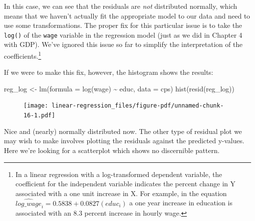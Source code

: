 \documentclass[
  letterpaper,
]{book}
\newenvironment{Shaded}{\begin{snugshade}}{\end{snugshade}}
\newcommand{\AttributeTok}[1]{\textcolor[rgb]{0.40,0.45,0.13}{#1}}
\newcommand{\FunctionTok}[1]{\textcolor[rgb]{0.28,0.35,0.67}{#1}}
\newcommand{\NormalTok}[1]{\textcolor[rgb]{0.00,0.23,0.31}{#1}}
\newcommand{\OtherTok}[1]{\textcolor[rgb]{0.00,0.23,0.31}{#1}}
\newcommand{\SpecialCharTok}[1]{\textcolor[rgb]{0.37,0.37,0.37}{#1}}
\begin{document}
In this case, we can see that the residuals are \emph{not} distributed
normally, which means that we haven't actually fit the appropriate model
to our data and need to use some transformations. The proper fix for
this particular issue is to take the \texttt{log()} of the \texttt{wage}
variable in the regression model (just as we did in Chapter 4 with GDP).
We've ignored this issue so far to simplify the interpretation of the
coefficients.\footnote{In a linear regression with a log-transformed
  dependent variable, the coefficient for the independent variable
  indicates the percent change in Y associated with a one unit increase
  in X. For example, in the equation
  \(\widehat{log\_wage}_{i} = 0.5838 + 0.0827(educ_i)\) a one year
  increase in education is associated with an 8.3 percent increase in
  hourly wage.}

If we were to make this fix, however, the histogram shows the results:

\begin{Shaded}
\begin{Highlighting}[]
\NormalTok{reg\_log }\OtherTok{\textless{}{-}} \FunctionTok{lm}\NormalTok{(}\AttributeTok{formula =} \FunctionTok{log}\NormalTok{(wage) }\SpecialCharTok{\textasciitilde{}}\NormalTok{ educ, }\AttributeTok{data =}\NormalTok{ cps)}
\FunctionTok{hist}\NormalTok{(}\FunctionTok{resid}\NormalTok{(reg\_log))}
\end{Highlighting}
\end{Shaded}

\begin{figure}[H]

{\centering \texttt{[image: linear-regression\_files/figure-pdf/unnamed-chunk-16-1.pdf]}

}

\end{figure}

Nice and (nearly) normally distributed now. The other type of residual
plot we may wish to make involves plotting the residuals against the
predicted y-values. Here we're looking for a scatterplot which shows no
discernible pattern.

\begin{Shaded}
\end{Shaded}
\end{document}
